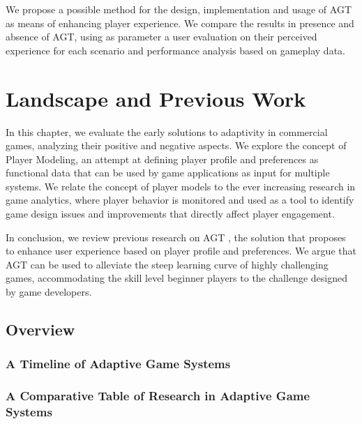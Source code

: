 \documentclass[cic,tc,english]{iiufrgs}
\begin{document}
We propose a possible method for the design, implementation and usage of AGT as means of enhancing player experience. We compare the results in presence and absence of AGT, using as parameter a user evaluation on their perceived experience for each scenario and performance analysis based on gameplay data.


\chapter{Landscape and Previous Work}

In this chapter, we evaluate the early solutions to adaptivity in commercial games, analyzing their positive and negative aspects. We explore the concept of Player Modeling, an attempt at defining player profile and preferences as functional data that can be used by game applications as input for multiple systems. We relate the concept of player models to the ever increasing research in game analytics, where player behavior is monitored and used as a tool to identify game design issues and improvements that directly affect player engagement.

In conclusion, we review previous research on AGT \cite{ARTICLE_PlayerCentredGameDesign}, the solution that proposes to enhance user experience based on player profile and preferences. We argue that AGT can be used to alleviate the steep learning curve of highly challenging games, accommodating the skill level beginner players to the challenge designed by game developers.

\section{Overview}

\subsection{A Timeline of Adaptive Game Systems}

\subsection{A Comparative Table of Research in Adaptive Game Systems}
\end{document}
